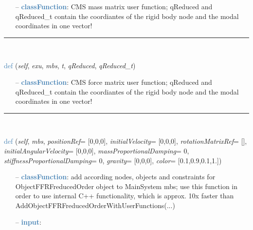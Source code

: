 \begin{itemize}[leftmargin=1.4cm]
\begin{itemize}[leftmargin=1.4cm]
\begin{itemize}[leftmargin=0.5cm]
\begin{itemize}[leftmargin=1.4cm]
\begin{itemize}[leftmargin=1.4cm]
\begin{itemize}[leftmargin=0.5cm]
\begin{flushleft}
\end{flushleft}
\setlength{\itemindent}{0.7cm}
\begin{itemize}[leftmargin=0.7cm]
  \item[--]  \textcolor{steelblue}{\bf classFunction}: CMS mass matrix user function; qReduced and qReduced\_t contain the coordiantes of the rigid body node and the modal coordinates in one vector!\vspace{12pt}\end{itemize}
%
\noindent\rule{8cm}{0.75pt}\vspace{1pt} \\ 
\begin{flushleft}
\noindent \textcolor{steelblue}{def {\bf {}}}\label{sec:FEM:ObjectFFRFreducedOrderInterface:UFforceFFRFreducedOrder}
({\it self}, {\it exu}, {\it mbs}, {\it t}, {\it qReduced}, {\it qReduced\_t})
\end{flushleft}
\setlength{\itemindent}{0.7cm}
\begin{itemize}[leftmargin=0.7cm]
  \item[--]  \textcolor{steelblue}{\bf classFunction}: CMS force matrix user function; qReduced and qReduced\_t contain the coordiantes of the rigid body node and the modal coordinates in one vector!\vspace{12pt}\end{itemize}
%
\noindent\rule{8cm}{0.75pt}\vspace{1pt} \\ 
\begin{flushleft}
\noindent \textcolor{steelblue}{def {\bf {}}}\label{sec:FEM:ObjectFFRFreducedOrderInterface:AddObjectFFRFreducedOrder}
({\it self}, {\it mbs}, {\it positionRef}= [0,0,0], {\it initialVelocity}= [0,0,0], {\it rotationMatrixRef}= [], {\it initialAngularVelocity}= [0,0,0], {\it massProportionalDamping}= 0, {\it stiffnessProportionalDamping}= 0, {\it gravity}= [0,0,0], {\it color}= [0.1,0.9,0.1,1.])
\end{flushleft}
\setlength{\itemindent}{0.7cm}
\begin{itemize}[leftmargin=0.7cm]
  \item[--]  \textcolor{steelblue}{\bf classFunction}: add according nodes, objects and constraints for ObjectFFRFreducedOrder object to MainSystem mbs; use this function in order to use internal C++ functionality, which is approx. 10x faster than AddObjectFFRFreducedOrderWithUserFunctions(...)  \item[--]  \textcolor{steelblue}{\bf input}: \vspace{-6pt}

\end{itemize}
\end{itemize}
\end{itemize}
\end{itemize}
\end{itemize}
\end{itemize}
\end{itemize}
